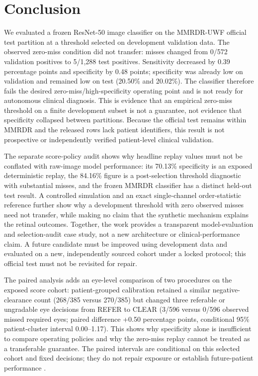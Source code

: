\documentclass{ieeeaccess}
\begin{document}
\section{Conclusion}
We evaluated a frozen ResNet-50 image classifier on the MMRDR-UWF official test partition at a threshold selected on development validation data. The observed zero-miss condition did not transfer: misses changed from 0/572 validation positives to 5/1,288 test positives. Sensitivity decreased by 0.39 percentage points and specificity by 0.48 points; specificity was already low on validation and remained low on test (20.50\% and 20.02\%). The classifier therefore fails the desired zero-miss/high-specificity operating point and is not ready for autonomous clinical diagnosis. This is evidence that an empirical zero-miss threshold on a finite development subset is not a guarantee, not evidence that specificity collapsed between partitions. Because the official test remains within MMRDR and the released rows lack patient identifiers, this result is not prospective or independently verified patient-level clinical validation.

The separate score-policy audit shows why headline replay values must not be conflated with raw-image model performance: its 70.13\% specificity is an exposed deterministic replay, the 84.16\% figure is a post-selection threshold diagnostic with substantial misses, and the frozen MMRDR classifier has a distinct held-out test result. A controlled simulation and an exact single-channel order-statistic reference further show why a development threshold with zero observed misses need not transfer, while making no claim that the synthetic mechanism explains the retinal outcomes. Together, the work provides a transparent model-evaluation and selection-audit case study, not a new architecture or clinical-performance claim. A future candidate must be improved using development data and evaluated on a new, independently sourced cohort under a locked protocol; this official test must not be revisited for repair.

The paired analysis adds an eye-level comparison of two procedures on the exposed score cohort: patient-grouped calibration retained a similar negative-clearance count (268/385 versus 270/385) but changed three referable or ungradable eye decisions from REFER to CLEAR (3/596 versus 0/596 observed missed required eyes; paired difference +0.50 percentage points, conditional 95\% patient-cluster interval 0.00--1.17). This shows why specificity alone is insufficient to compare operating policies and why the zero-miss replay cannot be treated as a transferable guarantee. The paired intervals are conditional on this selected cohort and fixed decisions; they do not repair exposure or establish future-patient performance \cite{openaiChatGPT}.
\end{document}

